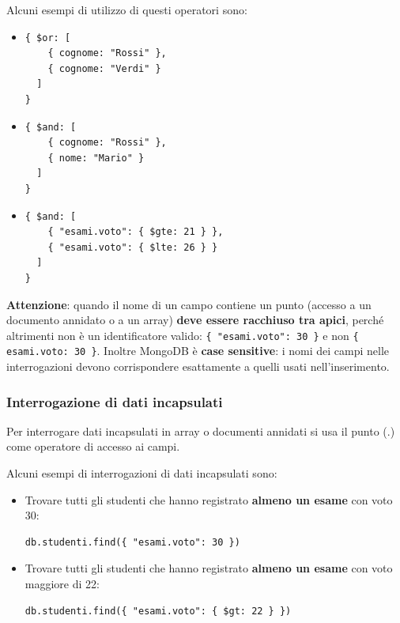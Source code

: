 \documentclass[a4paper,twoside]{article}
\begin{document}
\begin{example}
  Alcuni esempi di utilizzo di questi operatori sono:
  \begin{itemize}
    \item
\begin{lstlisting}
{ $or: [
    { cognome: "Rossi" },
    { cognome: "Verdi" }
  ]
}
\end{lstlisting}

    \item
\begin{lstlisting}
{ $and: [
    { cognome: "Rossi" },
    { nome: "Mario" }
  ]
}
\end{lstlisting}

    \item
\begin{lstlisting}
{ $and: [
    { "esami.voto": { $gte: 21 } },
    { "esami.voto": { $lte: 26 } }
  ]
}
\end{lstlisting}
  \end{itemize}

  \vspace{1em}
  \noindent
  \textbf{Attenzione}: quando il nome di un campo contiene un punto (accesso a un
  documento annidato o a un array) \textbf{deve essere racchiuso tra apici}, perché
  altrimenti non è un identificatore valido:
  \texttt{\{ "esami.voto": 30 \}} e non \texttt{\{ esami.voto: 30 \}}.
  Inoltre MongoDB è \textbf{case sensitive}: i nomi dei campi nelle interrogazioni
  devono corrispondere esattamente a quelli usati nell'inserimento.
\end{example}

\subsubsection{Interrogazione di dati incapsulati}
Per interrogare dati incapsulati in array o documenti annidati si usa il punto (.)
come operatore di accesso ai campi.

\begin{example}
  Alcuni esempi di interrogazioni di dati incapsulati sono:
  \begin{itemize}
    \item Trovare tutti gli studenti che hanno registrato \textbf{almeno un esame} con
      voto 30:
\begin{lstlisting}
db.studenti.find({ "esami.voto": 30 })
\end{lstlisting}

\item Trovare tutti gli studenti che hanno registrato \textbf{almeno un esame} con
  voto maggiore di 22:
\begin{lstlisting}
db.studenti.find({ "esami.voto": { $gt: 22 } })
\end{lstlisting}
  \end{itemize}
\end{example}
\end{document}

